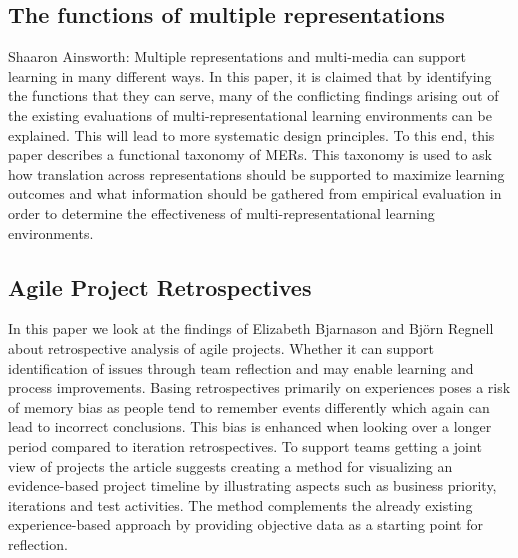 \subsection{The functions of multiple representations}
Shaaron Ainsworth: Multiple representations and multi-media can support learning in many different ways\citep{Ainsworth1999}. In this paper, it is claimed that by identifying the functions that they can serve, many of the conflicting findings arising out of the existing evaluations of multi-representational learning environments can be explained. This will lead to more systematic design principles. To this end, this paper describes a functional taxonomy of MERs. This taxonomy is used to ask how translation across representations should be supported to maximize learning outcomes and what information should be gathered from empirical evaluation in order to determine the effectiveness of multi-representational learning environments.

\subsection{Agile Project Retrospectives}
In this paper we look at the findings of Elizabeth Bjarnason and Björn Regnell about retrospective analysis of agile projects\citep{Bjarnason2012}. Whether it can support identification of issues through team reflection and may enable learning and process improvements. Basing retrospectives primarily on experiences poses a risk of memory bias as people tend to remember events differently which again can lead to incorrect conclusions. This bias is enhanced when looking over a longer period compared to iteration retrospectives. To support teams getting a joint view of projects the article suggests creating a method for visualizing an evidence-based project timeline by illustrating aspects such as business priority, iterations and test activities. The method complements the already existing experience-based approach by providing objective data as a starting point for reflection.